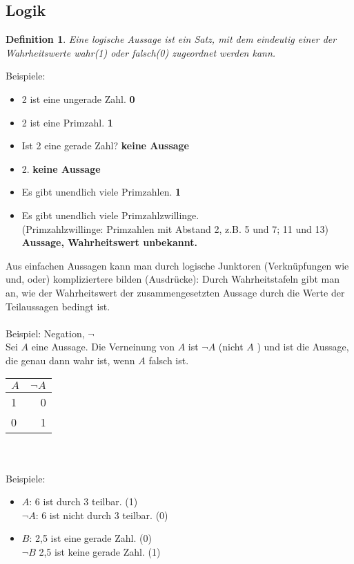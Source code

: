 \documentclass[a4paper,11pt]{article}
\newtheorem{definition}{Definition}[section]
\begin{document}
\subsection{Logik}
\begin{definition}
Eine logische Aussage ist ein Satz, mit dem eindeutig einer der Wahrheitswerte \glq wahr\grq (1) oder \glq falsch\grq (0) zugeordnet werden kann.
\end{definition}
Beispiele:
\begin{itemize}
\item 2 ist eine ungerade Zahl. \textbf{0}
\item 2 ist eine Primzahl. \textbf{1}
\item Ist 2 eine gerade Zahl? \textbf{keine Aussage}
\item 2. \textbf{keine Aussage}
\item Es gibt unendlich viele Primzahlen. \textbf{1}
\item Es gibt unendlich viele Primzahlzwillinge. \\
(Primzahlzwillinge: Primzahlen mit Abstand 2, z.B. 5 und 7; 11 und 13) \textbf{Aussage, Wahrheitswert unbekannt.}
\end{itemize}
Aus einfachen Aussagen kann man durch logische Junktoren (Verknüpfungen wie \glq und\grq, \glq oder\grq) kompliziertere bilden (Ausdrücke): Durch Wahrheitstafeln gibt man an, wie der Wahrheitswert der zusammengesetzten Aussage durch die Werte der Teilaussagen bedingt ist. \\~\\
Beispiel: Negation, $\lnot$ \\
Sei $A$ eine Aussage.  Die Verneinung von $A$ ist $\lnot A$ (\glqq nicht $A$ \grqq) und ist die Aussage, die genau dann wahr ist, wenn $A$ falsch ist. \\
\begin{tabular}{l|r}
$A$ & $\lnot A$ \\
\hline 
1 & 0 \\
0 & 1
\end{tabular} \\~\\
Beispiele:
\begin{itemize}
\item $A$: 6 ist durch 3 teilbar. (1) \\
$\lnot A$: 6 ist nicht durch 3 teilbar. (0)
\item $B$: 2,5 ist eine gerade Zahl. (0) \\
$\lnot B$ 2,5 ist keine gerade Zahl. (1)
\end{itemize}
\end{document}
